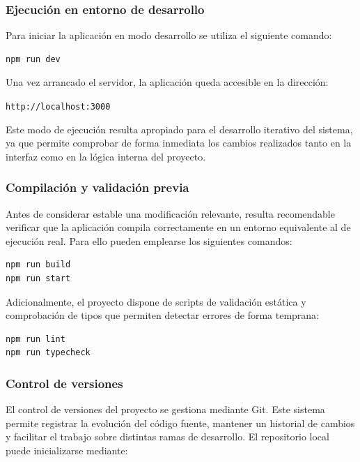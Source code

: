 \subsubsection*{Ejecución en entorno de desarrollo}

Para iniciar la aplicación en modo desarrollo se utiliza el siguiente comando:

\begin{lstlisting}[language=bash]
npm run dev
\end{lstlisting}

Una vez arrancado el servidor, la aplicación queda accesible en la dirección:

\begin{center}
    \texttt{http://localhost:3000}
\end{center}

Este modo de ejecución resulta apropiado para el desarrollo iterativo del sistema, ya que permite comprobar de forma inmediata los cambios realizados tanto en la interfaz como en la lógica interna del proyecto.

\subsubsection*{Compilación y validación previa}

Antes de considerar estable una modificación relevante, resulta recomendable verificar que la aplicación compila correctamente en un entorno equivalente al de ejecución real. Para ello pueden emplearse los siguientes comandos:

\begin{lstlisting}[language=bash]
npm run build
npm run start
\end{lstlisting}

Adicionalmente, el proyecto dispone de scripts de validación estática y comprobación de tipos que permiten detectar errores de forma temprana:

\begin{lstlisting}[language=bash]
npm run lint
npm run typecheck
\end{lstlisting}

\subsubsection*{Control de versiones}

El control de versiones del proyecto se gestiona mediante Git. Este sistema permite registrar la evolución del código fuente, mantener un historial de cambios y facilitar el trabajo sobre distintas ramas de desarrollo. El repositorio local puede inicializarse mediante:

